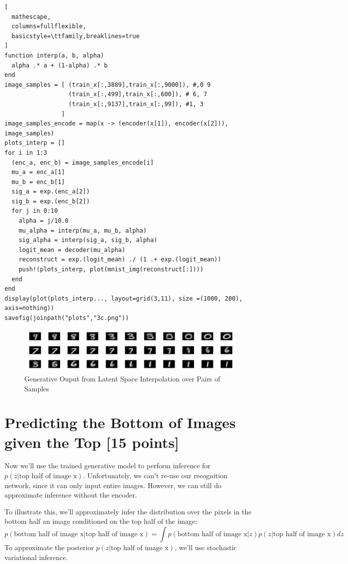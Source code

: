 \documentclass{article}
\begin{document}
\begin{enumerate}[label=(\alph*)]
\begin{lstlisting}[
  mathescape,
  columns=fullflexible,
  basicstyle=\ttfamily,breaklines=true
]
function interp(a, b, alpha)
  alpha .* a + (1-alpha) .* b
end
image_samples = [ (train_x[:,3889],train_x[:,9000]), #,0 9
                  (train_x[:,499],train_x[:,600]), # 6, 7
                  (train_x[:,9137],train_x[:,99]), #1, 3
                ]
image_samples_encode = map(x -> (encoder(x[1]), encoder(x[2])), image_samples)
plots_interp = []
for i in 1:3
  (enc_a, enc_b) = image_samples_encode[i]
  mu_a = enc_a[1]
  mu_b = enc_b[1]
  sig_a = exp.(enc_a[2])
  sig_b = exp.(enc_b[2])
  for j in 0:10
    alpha = j/10.0
    mu_alpha = interp(mu_a, mu_b, alpha)
    sig_alpha = interp(sig_a, sig_b, alpha)
    logit_mean = decoder(mu_alpha)
    reconstruct = exp.(logit_mean) ./ (1 .+ exp.(logit_mean))
    push!(plots_interp, plot(mnist_img(reconstruct[:])))
  end
end
display(plot(plots_interp..., layout=grid(3,11), size =(1000, 200), axis=nothing))
savefig(joinpath("plots","3c.png"))
\end{lstlisting}
\begin{figure}[h]
  \centering
  \includegraphics[width=17cm]{plots/3c.png}
  \caption{Generative Ouput from Latent Space Interpolation over Pairs of Samples}
\end{figure}

\end{enumerate}


\pagebreak

\section{Predicting the Bottom of Images given the Top [15 points]}

Now we'll use the trained generative model to perform inference for $p(z|\text{top half of image x})$.
Unfortunately, we can't re-use our recognition network, since it can only input entire images.
However, we can still do approximate inference without the encoder.

To illustrate this, we'll approximately infer the distribution over the pixels in the bottom half an image conditioned on the top half of the image:
$$p(\text{bottom half of image x} | \text{top half of image x}) = \int p(\text{bottom half of image x} | z) p( z | \text{top half of image x}) dz$$
To approximate the posterior $p( z | \text{top half of image x})$, we'll use stochastic variational inference.
\end{document}
